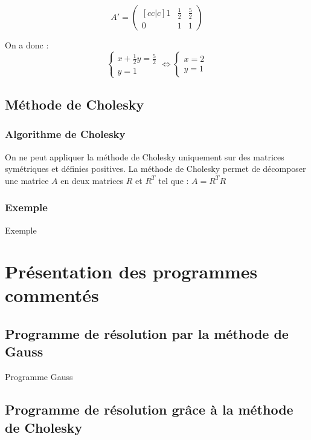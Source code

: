 \documentclass{article}
\begin{document}
\[ A' =
 \begin{pmatrix}[cc|c]
  1 & \frac{1}{2} & \frac{5}{2} \\
  0 & 1           & 1
 \end{pmatrix}\]

On a donc :
\[\begin{cases}
  x + \frac{1}{2}y = \frac{5}{2} \\
  y = 1
 \end{cases}
 \iff
 \begin{cases}
  x = 2 \\
  y = 1
 \end{cases}
\]


\subsection{Méthode de Cholesky}

\subsubsection{Algorithme de Cholesky}

On ne peut appliquer la méthode de Cholesky uniquement sur des matrices symétriques et définies positives.
La méthode de Cholesky permet de décomposer une matrice $A$ en deux matrices $R$ et $R^T$ tel que : $A = R^T R$

\subsubsection{Exemple}

Exemple

\section{Présentation des programmes commentés}

\subsection{Programme de résolution par la méthode de Gauss}

\begin{boxedverbatim}
 Programme Gauss
\end{boxedverbatim}

\subsection{Programme de résolution grâce à la méthode de Cholesky}
\end{document}

